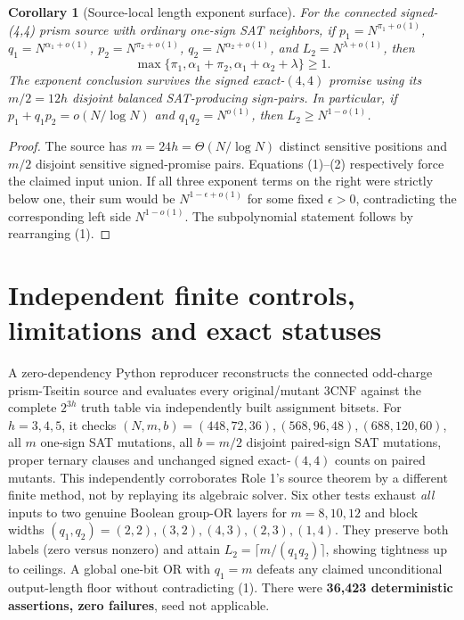 \documentclass[11pt]{article}
\newtheorem{corollary}[theorem]{Corollary}
\begin{document}
\begin{corollary}[Source-local length exponent surface]\label{co:surface}
For the connected signed-(4,4) prism source with ordinary one-sign SAT neighbors, if
$p_1=N^{\pi_1+o(1)}$, $q_1=N^{\alpha_1+o(1)}$, $p_2=N^{\pi_2+o(1)}$, $q_2=N^{\alpha_2+o(1)}$, and $L_2=N^{\lambda+o(1)}$, then
\[
\boxed{\max\{\pi_1,\alpha_1+\pi_2,\alpha_1+\alpha_2+\lambda\}\ge 1.}\tag{3}
\]
The exponent conclusion survives the signed exact-$(4,4)$ promise using its $m/2=12h$ disjoint balanced SAT-producing sign-pairs. In particular, if $p_1+q_1p_2=o(N/\log N)$ and $q_1q_2=N^{o(1)}$, then $L_2\ge N^{1-o(1)}$.
\end{corollary}
\begin{proof}
The source has $m=24h=\Theta(N/\log N)$ distinct sensitive positions and $m/2$ disjoint sensitive signed-promise pairs. Equations (1)--(2) respectively force the claimed input union. If all three exponent terms on the right were strictly below one, their sum would be $N^{1-\epsilon+o(1)}$ for some fixed $\epsilon>0$, contradicting the corresponding left side $N^{1-o(1)}$. The subpolynomial statement follows by rearranging (1).
\end{proof}

\section{Independent finite controls, limitations and exact statuses}
A zero-dependency Python reproducer reconstructs the connected odd-charge prism-Tseitin source and evaluates every original/mutant 3CNF against the complete $2^{3h}$ truth table via independently built assignment bitsets. For $h=3,4,5$, it checks $(N,m,b)=(448,72,36),(568,96,48),(688,120,60)$, all $m$ one-sign SAT mutations, all $b=m/2$ disjoint paired-sign SAT mutations, proper ternary clauses and unchanged signed exact-$(4,4)$ counts on paired mutants. This independently corroborates Role 1's source theorem by a different finite method, not by replaying its algebraic solver. Six other tests exhaust \emph{all} inputs to two genuine Boolean group-OR layers for $m=8,10,12$ and block widths $(q_1,q_2)=(2,2),(3,2),(4,3),(2,3),(1,4)$. They preserve both labels (zero versus nonzero) and attain $L_2=\lceil m/(q_1q_2)\rceil$, showing tightness up to ceilings. A global one-bit OR with $q_1=m$ defeats any claimed unconditional output-length floor without contradicting (1). There were \textbf{36,423 deterministic assertions, zero failures}, seed not applicable.
\end{document}
